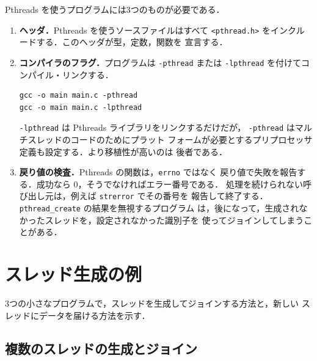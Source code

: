 \documentclass[../main.tex]{subfiles}
\begin{document}
Pthreads を使うプログラムには3つのものが必要である．
\begin{enumerate}
  \item \textbf{ヘッダ．}Pthreads を使うソースファイルはすべて
    \texttt{<pthread.h>} をインクルードする．このヘッダが型，定数，関数を
    宣言する．
  \item \textbf{コンパイラのフラグ．}プログラムは \texttt{-pthread} または
    \texttt{-lpthread} を付けてコンパイル・リンクする．%
\begin{lstlisting}[numbers=none]
gcc -o main main.c -pthread
gcc -o main main.c -lpthread
\end{lstlisting}
    \texttt{-lpthread} は Pthreads ライブラリをリンクするだけだが，
    \mbox{\texttt{-pthread}} はマルチスレッドのコードのためにプラット
    フォームが必要とするプリプロセッサ定義も設定する．より移植性が高いのは
    後者である．
  \item \textbf{戻り値の検査．}Pthreads の関数は，\texttt{errno} ではなく
    戻り値で失敗を報告する．成功なら 0，そうでなければエラー番号である．
    処理を続けられない呼び出し元は，例えば \texttt{strerror} でその番号を
    報告して終了する．\texttt{pthread\_create} の結果を無視するプログラム
    は，後になって，生成されなかったスレッドを，設定されなかった識別子を
    使ってジョインしてしまうことがある．
\end{enumerate}

\section{スレッド生成の例}
\label{sec:l04-examples}

3つの小さなプログラムで，スレッドを生成してジョインする方法と，新しい
スレッドにデータを届ける方法を示す．

\subsection{複数のスレッドの生成とジョイン}
\end{document}
